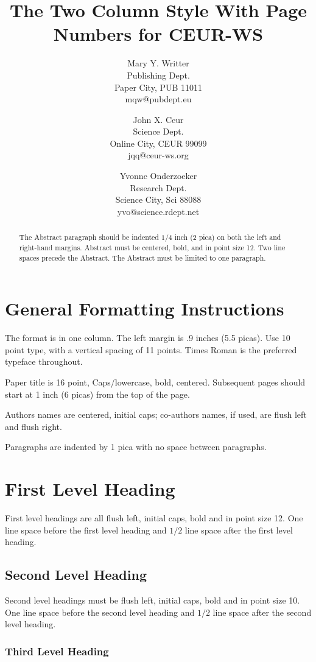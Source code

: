 \documentclass[a4paper]{article}
\title{The Two Column Style With Page Numbers for CEUR-WS}
\author{
Mary Y. Writter \\ Publishing Dept.\\
                Paper City, PUB 11011 \\ mqw@pubdept.eu
\and
John X. Ceur \\ Science Dept.\\
                Online City, CEUR 99099 \\ jqq@ceur-ws.org
\and
Yvonne Onderzoeker \\ Research Dept.\\
                Science City, Sci 88088 \\ yvo@science.rdept.net
}
\begin{document}
\maketitle

\begin{abstract}
The Abstract paragraph should be indented $1/4$ inch (2 pica) on both
the left and right-hand margins. Abstract must be centered, bold, and
in point size 12. Two line spaces precede the Abstract. The Abstract
must be limited to one paragraph.
\end{abstract}


\section{General Formatting Instructions}

The format is in one column. The left margin is .9 inches (5.5 picas). Use 10 point type,
with a vertical spacing of 11 points. Times Roman is the preferred
typeface throughout.

Paper title is 16 point, Caps/lowercase, bold, centered. Subsequent
pages should start at 1 inch (6 picas) from the top of the page.

Authors names are centered, initial caps; co-authors names, if used, are
flush left and flush right.

Paragraphs are indented by 1 pica with no space between paragraphs.

\section{First Level Heading}

First level headings are all flush left, initial caps, bold and in point
size 12. One line space before the first level heading and $1/2$ line
space after the first level heading.

\subsection{Second Level Heading}

Second level headings must be flush left, initial caps, bold and in point
size 10. One line space before the second level heading and $1/2$ line
space after the second level heading.

\subsubsection{Third Level Heading}
\end{document}
